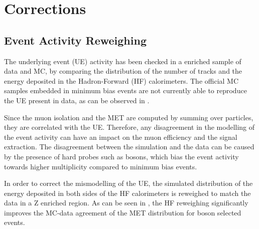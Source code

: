 \section{Corrections}\label{sec:WBoson_Corrections}


\subsection{Event Activity Reweighing}\label{sec:WBoson_Corrections_EventActivityReweighing}

The \pPb underlying event (UE) activity has been checked in a \DYToMuMu enriched sample of data and MC, by comparing the distribution of the number of tracks and the energy deposited in the Hadron-Forward (HF) calorimeters. The official MC samples embedded in \EPOS minimum bias events are not currently able to reproduce the UE present in \pPb data, as can be observed in .

Since the muon isolation and the MET are computed by summing over particles, they are correlated with the UE. Therefore, any disagreement in the modelling of the event activity can have an impact on the muon efficiency and the signal extraction. The disagreement between the simulation and the data can be caused by the presence of hard probes such as \W bosons, which bias the event activity towards higher multiplicity compared to minimum bias events.

In order to correct the mismodelling of the UE, the simulated distribution of the energy deposited in both sides of the HF calorimeters is reweighed to match the data in a Z enriched region. 
As can be seen in , the HF reweighing significantly improves the MC-data agreement of the MET distribution for \Z boson selected events. 

